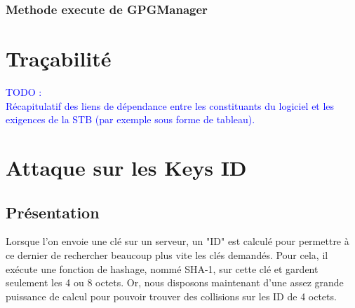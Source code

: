 \documentclass{../res/univ-projet}
\begin{document}
  \subsubsection{Methode execute de GPGManager}
  \begin{center}
  \end{center}




\section{Traçabilité} %
\label{sec:tra_abilit_}

  \textcolor{blue}{
    TODO : \\
    Récapitulatif des liens de dépendance entre les constituants du logiciel et les exigences de
    la STB (par exemple sous forme de tableau).
  }
  
\section{Attaque sur les Keys ID}
\subsection{Présentation}
Lorsque l'on envoie une clé sur un serveur, un "ID" est calculé pour permettre à ce dernier 
de rechercher beaucoup plus vite les clés demandés. Pour cela, il exécute une fonction de hashage, nommé SHA-1,
sur cette clé et gardent seulement les 4 ou 8 octets. Or, nous disposons maintenant d'une assez grande 
puissance de calcul pour pouvoir trouver des collisions sur les ID de 4 octets.
\end{document}
